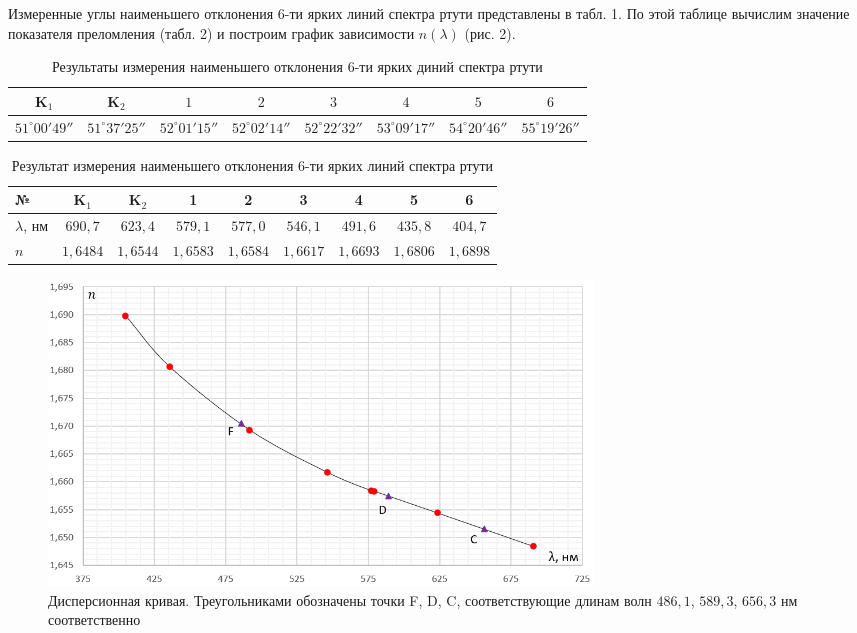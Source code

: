 \documentclass[a4paper]{article}
\begin{document}
Измеренные углы наименьшего отклонения 6-ти ярких линий спектра ртути представлены в табл. 1. По этой таблице вычислим значение показателя преломления (табл. 2) и построим график зависимости $n(\lambda)$ (рис. 2). 

\begin{table}[!ht]
    \centering
    \caption{Результаты измерения наименьшего отклонения 6-ти ярких диний спектра ртути}
    \begin{tabular}{|c|c|c|c|c|c|c|c|}
    \hline
    K$_1$                 & K$_2$                 & $1$                   & $2$                   & $3$                   & $4$                   & $5$                   & $6$                   \\ \hline
    $51^{\circ} 00' 49''$ & $51^{\circ} 37' 25''$ & $52^{\circ} 01' 15''$ & $52^{\circ} 02' 14''$ & $52^{\circ} 22' 32''$ & $53^{\circ} 09' 17''$ & $54^{\circ} 20' 46''$ & $55^{\circ} 19' 26''$ \\ \hline
    \end{tabular}
    \end{table}

\begin{table}[!ht]
    \centering
    \caption{Результат измерения наименьшего отклонения 6-ти ярких линий спектра ртути}
    \begin{tabular}{|l|c|c|c|c|c|c|c|c|}
    \hline
    №             & K$_1$     & K$_2$     & 1         & 2         & 3         & 4         & 5         & 6         \\ \hline
    $\lambda$, нм & $690,7$   & $623,4$   & $579,1$   & $577,0$   & $546,1$   & $491,6$   & $435,8$   & $404,7$   \\ \hline
    $n$           & $1,6484$ & $1,6544$ & $1,6583$ & $1,6584$ & $1,6617$ & $1,6693$ & $1,6806$ & $1,6898$ \\ \hline
    \end{tabular}
    \end{table}

    \begin{figure}[ht!]
        \centering
        \includegraphics[width = 0.7\textwidth]{image/graph1.png}
        \caption{Дисперсионная кривая. Треугольниками обозначены точки F, D, C, соответствующие длинам волн $486,1$, $589,3$, $656,3$ нм соответственно}
    \end{figure}
    
\end{document}
